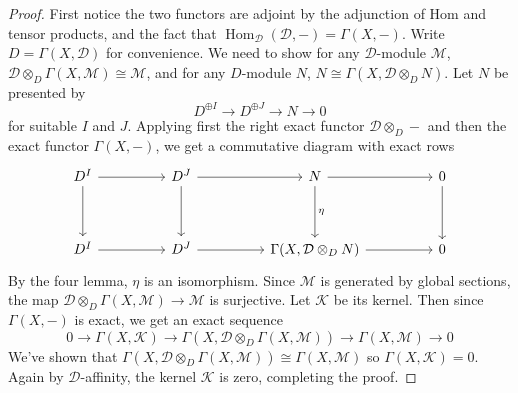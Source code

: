 \documentclass[11pt, a4paper]{article}
\theoremstyle{definition}
\newcommand{\Hom}[0]{\operatorname{Hom}}
\begin{document}
    \begin{proof}
        First notice the two functors are adjoint by the adjunction of Hom and tensor products, and the fact that $\Hom_{\mathcal D}(\mathcal D, -)=\Gamma(X,-)$. Write $D=\Gamma(X,\mathcal D)$ for convenience. We need to show for any $\mathcal D$-module $\mathcal M$, $\mathcal D\otimes_{D}\Gamma(X, \mathcal M)\cong\mathcal M$, and for any $D$-module $N$, $N\cong\Gamma(X, \mathcal D\otimes_DN)$. Let $N$ be presented by
        \[D^{\oplus I}\to D^{\oplus J}\to N\to 0\]
        for suitable $I$ and $J$. Applying first the right exact functor $\mathcal D\otimes_{D}-$ and then the exact functor $\Gamma(X, -)$, we get a commutative diagram with exact rows 
        \[\begin{tikzcd}
            D^I \arrow[rr] \arrow[dd] &  & D^J \arrow[rr] \arrow[dd] &  & N \arrow[rr] \arrow[dd, "\eta"]                &  & 0 \arrow[dd] \\
                                      &  &                           &  &                                                &  &              \\
            D^I \arrow[rr]            &  & D^J \arrow[rr]            &  & {\Gamma(X, \mathcal D\otimes_DN)} \arrow[rr] &  & 0           
            \end{tikzcd}\]
        By the four lemma, $\eta$ is an isomorphism. Since $\mathcal M$ is generated by global sections,  the map $\mathcal D\otimes_{D}\Gamma(X, \mathcal M)\to \mathcal M$ is surjective. Let $\mathcal K$ be its kernel. Then since $\Gamma(X, -)$ is exact, we get an exact sequence
        \[0\to\Gamma(X, \mathcal K)\to\Gamma(X, \mathcal D\otimes_{D}\Gamma(X, \mathcal M))\to\Gamma(X, \mathcal M)\to 0\]
        We've shown that $\Gamma(X, \mathcal D\otimes_{D}\Gamma(X, \mathcal M))\cong \Gamma(X, \mathcal M)$ so $\Gamma(X,\mathcal K)=0$. Again by $\mathcal D$-affinity, the kernel $\mathcal K$ is zero, completing the proof.
    \end{proof}
\end{document}
